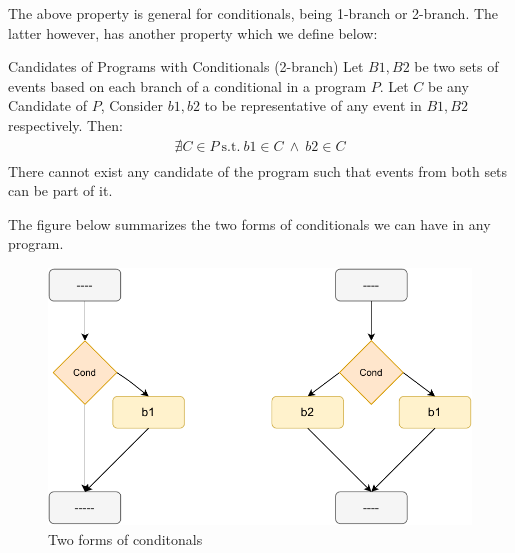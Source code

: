         The above property is general for conditionals, being 1-branch or 2-branch. The latter however, has another property which we define below:

        \begin{property}{Candidates of Programs with Conditionals (2-branch)}
            \label{CondB2}
            Let $B1,B2$ be two sets of events based on each branch of a conditional in a program $P$. Let $C$ be any Candidate of $P$,  Consider $b1,b2$ to be representative of any event in $B1,B2$ respectively. Then:
            \begin{align*}
                \nexists C \in P \ \text{s.t.} \ b1 \in C \ \wedge \ b2 \in C \\ 
            \end{align*}
            There cannot exist any candidate of the program such that events from both sets can be part of it. 
        \end{property}

        The figure below summarizes the two forms of conditionals we can have in any program. 
        \begin{figure}[H]
            \centering 
            \includegraphics[scale=0.7]{InstructionReordering/Conditionals2Form.pdf}
            \caption{Two forms of conditonals}
        \end{figure}



